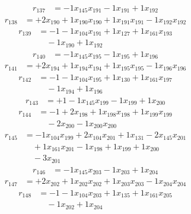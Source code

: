 \[\begin{aligned}
r_{137} &= - 1 x_{145} x_{191} - 1 x_{191} + 1 x_{192}
\end{aligned}\]
\[\begin{aligned}
r_{138} &= + 2 x_{190} + 1 x_{190} x_{190} + 1 x_{191} x_{191} - 1 x_{192} x_{192}
\end{aligned}\]
\[\begin{aligned}
r_{139} &= - 1 - 1 x_{104} x_{191} + 1 x_{127} + 1 x_{161} x_{193} \\
 &\quad - 1 x_{190} + 1 x_{192}
\end{aligned}\]
\[\begin{aligned}
r_{140} &= - 1 x_{145} x_{195} - 1 x_{195} + 1 x_{196}
\end{aligned}\]
\[\begin{aligned}
r_{141} &= + 2 x_{194} + 1 x_{194} x_{194} + 1 x_{195} x_{195} - 1 x_{196} x_{196}
\end{aligned}\]
\[\begin{aligned}
r_{142} &= - 1 - 1 x_{104} x_{195} + 1 x_{130} + 1 x_{161} x_{197} \\
 &\quad - 1 x_{194} + 1 x_{196}
\end{aligned}\]
\[\begin{aligned}
r_{143} &= + 1 - 1 x_{145} x_{199} - 1 x_{199} + 1 x_{200}
\end{aligned}\]
\[\begin{aligned}
r_{144} &= - 1 + 2 x_{198} + 1 x_{198} x_{198} + 1 x_{199} x_{199} \\
 &\quad - 2 x_{200} - 1 x_{200} x_{200}
\end{aligned}\]
\[\begin{aligned}
r_{145} &= - 1 x_{104} x_{199} + 2 x_{104} x_{201} + 1 x_{131} - 2 x_{145} x_{201} \\
 &\quad + 1 x_{161} x_{201} - 1 x_{198} + 1 x_{199} + 1 x_{200} \\
 &\quad - 3 x_{201}
\end{aligned}\]
\[\begin{aligned}
r_{146} &= - 1 x_{145} x_{203} - 1 x_{203} + 1 x_{204}
\end{aligned}\]
\[\begin{aligned}
r_{147} &= + 2 x_{202} + 1 x_{202} x_{202} + 1 x_{203} x_{203} - 1 x_{204} x_{204}
\end{aligned}\]
\[\begin{aligned}
r_{148} &= - 1 - 1 x_{104} x_{203} + 1 x_{135} + 1 x_{161} x_{205} \\
 &\quad - 1 x_{202} + 1 x_{204}
\end{aligned}\]
